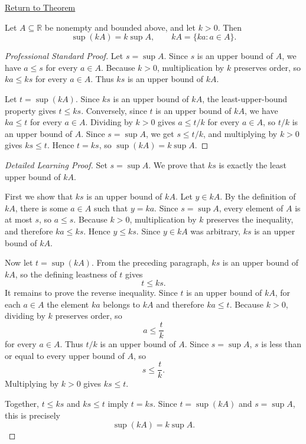 \newpage
{}
\label{prf:scalar-mult-positive}

\begin{remark*}[Return]
\hyperref[thm:scalar-mult-positive]{Return to Theorem}
\end{remark*}


\begin{theorem*}
Let $A\subseteq\mathbb{R}$ be nonempty and bounded above, and let $k>0$. Then
\[
  \sup(kA)=k\sup A,
  \qquad
  kA=\{ka:a\in A\}.
\]
\end{theorem*}

\begin{proof}[Professional Standard Proof]
\LRAProofBodyStart
Let $s=\sup A$. Since $s$ is an upper bound of $A$, we have $a\le s$ for
every $a\in A$. Because $k>0$, multiplication by $k$ preserves order, so
$ka\le ks$ for every $a\in A$. Thus $ks$ is an upper bound of $kA$.

Let $t=\sup(kA)$. Since $ks$ is an upper bound of $kA$, the least-upper-bound
property gives $t\le ks$. Conversely, since $t$ is an upper bound of $kA$,
we have $ka\le t$ for every $a\in A$. Dividing by $k>0$ gives
$a\le t/k$ for every $a\in A$, so $t/k$ is an upper bound of $A$. Since
$s=\sup A$, we get $s\le t/k$, and multiplying by $k>0$ gives $ks\le t$.
Hence $t=ks$, so $\sup(kA)=k\sup A$.
\end{proof}

\begin{proof}[Detailed Learning Proof]
\LRAProofBodyStart
Set $s=\sup A$. We prove that $ks$ is exactly the least upper bound of
$kA$.

First we show that $ks$ is an upper bound of $kA$. Let $y\in kA$. By the
definition of $kA$, there is some $a\in A$ such that $y=ka$. Since
$s=\sup A$, every element of $A$ is at most $s$, so $a\le s$. Because
$k>0$, multiplication by $k$ preserves the inequality, and therefore
$ka\le ks$. Hence $y\le ks$. Since $y\in kA$ was arbitrary, $ks$ is an
upper bound of $kA$.

Now let $t=\sup(kA)$. From the preceding paragraph, $ks$ is an upper bound
of $kA$, so the defining leastness of $t$ gives
\[
  t\le ks.
\]
It remains to prove the reverse inequality. Since $t$ is an upper bound of
$kA$, for each $a\in A$ the element $ka$ belongs to $kA$ and therefore
$ka\le t$. Because $k>0$, dividing by $k$ preserves order, so
\[
  a\le \frac{t}{k}
\]
for every $a\in A$. Thus $t/k$ is an upper bound of $A$. Since $s=\sup A$,
$s$ is less than or equal to every upper bound of $A$, so
\[
  s\le \frac{t}{k}.
\]
Multiplying by $k>0$ gives $ks\le t$.

Together, $t\le ks$ and $ks\le t$ imply $t=ks$. Since
$t=\sup(kA)$ and $s=\sup A$, this is precisely
\[
  \sup(kA)=k\sup A.
\]
\end{proof}

